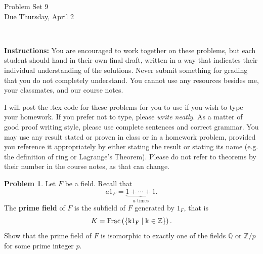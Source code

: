 \documentclass[11pt]{article}
\title{}
\date{\vspace{-0.5in}}
\newcommand{\Q}{\mathbb{Q}}
\newcommand{\Z}{\mathbb{Z}}
\theoremstyle{definition}
\newtheorem{problem}{Problem}
\begin{document}
\thispagestyle{fancy}
\pagestyle{fancy}

\vspace{3em}

\begin{center}
	{\LARGE Problem Set 9 \\}
	Due Thursday, April 2
\end{center}

\

\noindent
{\bf Instructions:}
You are encouraged to work together on these problems, but each student should hand in their own final draft, written in a way that indicates their individual understanding of the solutions. Never submit something for grading that you do not completely understand. You cannot use any resources besides me, your classmates, and our course notes.


I will post the .tex code for these problems for you to use if you wish to type your homework. If you prefer not to type, please  {\em write neatly}. As a matter of good proof writing style, please use complete sentences and correct grammar. You may use any result stated or proven in class or in a homework problem, provided you reference it appropriately by either stating the result or stating its name (e.g. the definition of ring or Lagrange's Theorem). Please do not refer to theorems by their number in the course notes, as that can change.


\begin{problem}
Let $F$ be a field. Recall that
$$a 1_F = \underset{a \textrm{ times}}{\underbrace{1 + \cdots + 1}}.$$ The {\bf prime field} of $F$ is the subfield of $F$ generated by $1_F$, that is
$$K=\rm{Frac}\left(\{k1_F \mid k\in \Z\}\right).$$ 
Show that the prime field of $F$ is isomorphic to exactly one of the fields $\Q$ or $\Z/p$ for some prime integer $p$.
\end{problem}
\end{document}
